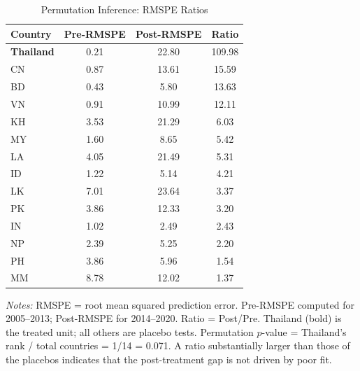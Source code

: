 \begin{table}[htbp]
\centering
\begin{threeparttable}
\caption{Permutation Inference: RMSPE Ratios}
\label{tab:rmspe}
\begin{tabular}{lccc}
\toprule
  Country & Pre-RMSPE & Post-RMSPE & Ratio \\
\midrule
  \textbf{Thailand} & 0.21 & 22.80 & 109.98 \\
  CN & 0.87 & 13.61 & 15.59 \\
  BD & 0.43 & 5.80 & 13.63 \\
  VN & 0.91 & 10.99 & 12.11 \\
  KH & 3.53 & 21.29 & 6.03 \\
  MY & 1.60 & 8.65 & 5.42 \\
  LA & 4.05 & 21.49 & 5.31 \\
  ID & 1.22 & 5.14 & 4.21 \\
  LK & 7.01 & 23.64 & 3.37 \\
  PK & 3.86 & 12.33 & 3.20 \\
  IN & 1.02 & 2.49 & 2.43 \\
  NP & 2.39 & 5.25 & 2.20 \\
  PH & 3.86 & 5.96 & 1.54 \\
  MM & 8.78 & 12.02 & 1.37 \\
\bottomrule
\end{tabular}
\begin{tablenotes}[flushleft]\footnotesize
\item \textit{Notes:} RMSPE = root mean squared prediction error. Pre-RMSPE computed for 2005--2013; Post-RMSPE for 2014--2020. Ratio = Post/Pre. Thailand (bold) is the treated unit; all others are placebo tests. Permutation $p$-value = Thailand's rank / total countries = 1/14 = 0.071. A ratio substantially larger than those of the placebos indicates that the post-treatment gap is not driven by poor fit.
\end{tablenotes}
\end{threeparttable}
\end{table}
